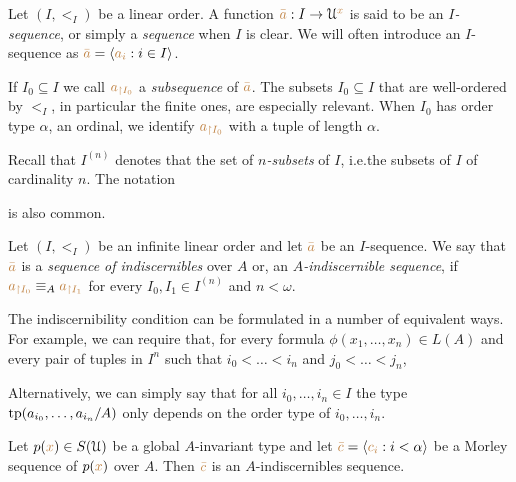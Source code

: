 Let $(I,<_I)$ be a linear order.
A function ${\color{brown}\bar a}:I\to\EuScript U^{\color{brown} x}$ is said to be an \emph{$I$-sequence}, or simply a \emph{sequence\/} when $I$ is clear.
We will often introduce an $I$-sequence as ${\color{brown}\bar a}=\langle{\color{brown}a_i}: i\in I\rangle$.

If $I_0\subseteq I$ we call ${\color{brown} a_{\restriction I_0}}$ a \emph{subsequence\/} of ${\color{brown}\bar a}$.
The subsets $I_0\subseteq I$ that are well-ordered by $<_I$, in particular the finite ones, are especially relevant.
When $I_0$ has order type $\alpha$, an ordinal, we identify ${\color{brown} a_{\restriction I_0}}$ with a tuple of length $\alpha$.

Recall that \emph{$I^{(n)}$} denotes that the set of \emph{$n$-subsets\/} of $I$,  i.e.\@ the subsets of $I$ of cardinality $n$.
The notation \smallskip


is also common.
\begin{definition}
Let $(I,<_I)$ be an infinite linear order and let ${\color{brown}\bar a}$ be an $I$-sequence.
We say that ${\color{brown}\bar a}$ is a \emph{sequence of indiscernibles\/} over $A$ or, an \emph{$A$-indiscernible sequence\/}, if ${\color{brown} a_{\restriction I_0}}\equiv_A {\color{brown} a_{\restriction I_1}}$ for every $I_0,I_1\in I^{(n)}$ and $n<\omega$.

\end{definition}

The indiscernibility condition can be formulated in a number of equivalent ways.
For example, we can require that, for every formula $\phi(x_1,\dots,x_n)\in L(A)$ and every pair of tuples in $I^n$ such that $i_0<\dots<i_n$ and $j_0<\dots<j_n$,



Alternatively, we can simply say that for all $i_0,\dots,i_n\in I$ the type ${\rm tp}(a_{i_0},\dots,a_{i_n}/A)$ only depends on the order type of $i_0,\dots,i_n$.

\begin{proposition}
Let $p({\color{brown} x})\in S(\EuScript U)$ be a global $A$-invariant type and let ${\color{brown}\bar c}=\langle{\color{brown}c_i}:i<\alpha\rangle$ be a Morley sequence of $p({\color{brown} x})$ over $A$.
Then ${\color{brown}\bar c}$ is an $A$-indiscernibles sequence.
\end{proposition}

